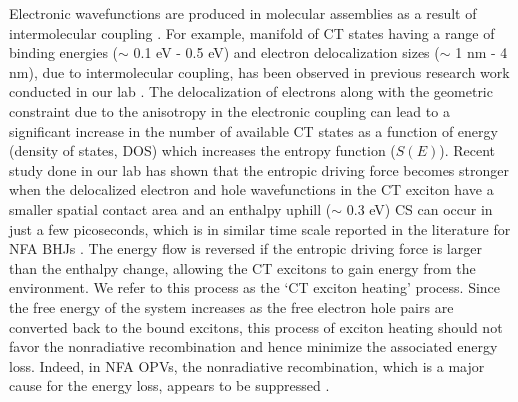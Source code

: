 \documentclass[12pt]{article}
\begin{document}
Electronic wavefunctions are produced in molecular assemblies as a result of intermolecular coupling \cite{bredas2004charge,scholes2006erratum}. For example, manifold of CT states having a range of binding energies ($\sim$ 0.1 eV - 0.5 eV) and electron delocalization sizes ($\sim$ 1 nm - 4 nm), due to intermolecular coupling, has been observed in previous research work conducted in our lab \cite{wang2017multidimensional}. The delocalization of electrons along with the geometric constraint due to the anisotropy in the electronic coupling can lead to a significant increase in the number of available CT states as a function of energy (density of states, DOS) which increases the entropy function ($S(E)$). Recent study done in our lab has shown that the entropic driving force becomes stronger when the delocalized electron and hole wavefunctions in the CT exciton have a smaller spatial contact area and an enthalpy uphill ($\sim$ 0.3 eV) CS can occur in just a few picoseconds, which is in similar time scale reported in the literature for NFA BHJs \cite{kafle2020spontaneous}. The energy flow is reversed if the entropic driving force is larger than the enthalpy change, allowing the CT excitons to gain energy from the environment. We refer to this process as the \lq{CT exciton heating}' process. Since the free energy of the system increases as the free electron hole pairs are converted back to the bound excitons, this process of exciton heating should not favor the nonradiative recombination and hence minimize the associated energy loss. Indeed, in NFA OPVs, the nonradiative recombination, which is a major cause for the energy loss, appears to be suppressed \cite{ostroverkhova2016organic}.
\end{document}
